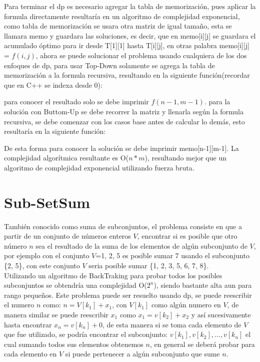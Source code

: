 \documentclass[12pt, a4paper]{article}
\newcommand\cppfile[2][]{

}
\begin{document}
\begin{figure}[!htb]
			\caption{}%
		\endminipage
	\end{figure}
	
	Para terminar el dp es necesario agregar la tabla de memorización, pues aplicar la formula directamente resultaría
	en un algoritmo de complejidad exponencial, como tabla de memorización se usara otra matriz de igual tamaño,
	esta se llamara memo y guardara las soluciones, es decir, que en memo[i][j] se guardara el acumulado óptimo para 
	ir desde T[1][1] hasta T[i][j], en otras palabra memo[i][j] = $f(i,j)$, ahora se puede solucionar el problema 
	usando cualquiera de los dos enfoques de dp, para usar Top-Down solamente se agrega la tabla de memorización 
	a la formula recursiva, resultando en la siguiente función(recordar que en C++ se indexa desde 0):
	\cppfile[9-20]{Programacion_dinamica/codigos/matriz.cpp}
	
	para conocer el resultado solo se debe imprimir $f(n-1, m-1)$. para la solución con Buttom-Up se debe recorrer 
	la matriz y llenarla según la formula recursiva, se debe comenzar con los casos base antes de calcular lo demás, 
	esto resultaría en la siguiente función:
	\cppfile[22-35]{Programacion_dinamica/codigos/matriz.cpp}
	De esta forma para conocer la solución se debe imprimir memo[n-1][m-1]. La complejidad algorítmica resultante
	es O($n*m$), resultando mejor que un algoritmo de complejidad exponencial utilizando fuerza bruta.\\
	
	\section{Sub-SetSum}
	
	También conocido como suma de subconjuntos, el problema consiste en que a partir de un conjunto de números enteros
	$V$, encontrar si es posible que otro número $n$ sea el resultado de la suma de los elementos de algún
	subconjunto de $V$, por ejemplo con el conjunto $V$={1, 2, 5} es posible sumar 7 usando el subconjunto \{2, 5\},
	con este conjunto $V$ seria posible sumar \{1, 2, 3, 5, 6, 7, 8\}.\\
	
	Utilizando un algoritmo de BackTraking para probar todos los posibles subconjuntos se obtendría una complejidad
	O($2^{n}$), siendo bastante alta aun para rango pequeños. Este problema puede ser resuelto usando dp, se puede
	reescribir el numero $n$ como: $n=V[k_{1}]+x_{1}$, con $V[k_{1}]$ como algún numero en $V$, de manera similar se
	puede reescribir $x_{1}$ como $x_{1}=v[k_{2}]+x_{2}$ y así sucesivamente hasta encontrar $x_{n}=v[k_{n}]+0$, de 
	esta manera si se toma cada elemento de $V$ que fue utilizado, se podría encontrar el subconjunto:
	${v[k_{1}],v[k_{2}],...,v[k_{n}]}$ el cual sumando todos sus elementos obtenemos $n$, en general se deberá probar
	para cada elemento en $V$ si puede pertenecer a algún subconjunto que sume $n$.
	
\end{document}

